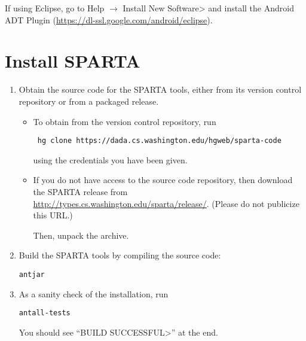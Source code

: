 If using Eclipse, go to
\<Help $\rightarrow$ Install New Software>
and install the Android ADT Plugin (\url{https://dl-ssl.google.com/android/eclipse}).




\section{Install SPARTA\label{sec:install}}

\begin{enumerate}

\item
  Obtain the source code for the SPARTA tools, either from its version
  control repository or from a packaged release.

\begin{itemize}
\item
  To obtain from the version control repository, run
\begin{Verbatim}
 hg clone https://dada.cs.washington.edu/hgweb/sparta-code
\end{Verbatim}
  using the credentials you have been given.
\item 
  If you do not have access to the source code repository, then
  download the SPARTA release from
  \url{http://types.cs.washington.edu/sparta/release/}.  (Please do not
  publicize this URL.)  

  Then, unpack the archive.
\end{itemize}

%


\item Build the SPARTA tools by compiling the source code:
\begin{alltt}
ant jar
\end{alltt}

\item
As a sanity check of the installation, run

\begin{alltt}
ant all-tests
\end{alltt}

You should see ``\<BUILD SUCCESSFUL>'' at the end.


\end{enumerate}


